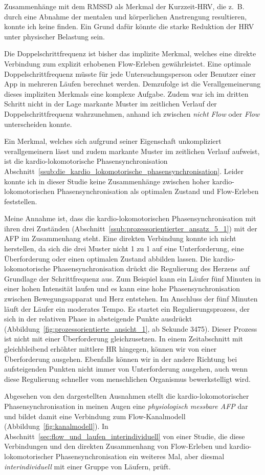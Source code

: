 Zusammenhänge mit dem \acs{RMSSD} als Merkmal der Kurzzeit-\ac{HRV}, die z.~B. durch eine Abnahme der mentalen und körperlichen Anstrengung resultieren, konnte ich keine finden. Ein Grund dafür könnte die starke Reduktion der \ac{HRV} unter physischer Belastung sein.

Die Doppelschrittfrequenz ist bisher das implizite Merkmal, welches eine direkte Verbindung zum explizit erhobenen Flow-Erleben gewährleistet. Eine optimale Doppelschrittfrequenz müsste für jede Untersuchungsperson oder Benutzer einer App in mehreren Läufen berechnet werden. Demzufolge ist die Verallgemeinerung dieses impliziten Merkmals eine komplexe Aufgabe. Zudem war ich im dritten Schritt nicht in der Lage markante Muster im zeitlichen Verlauf der Doppelschrittfrequenz wahrzunehmen, anhand ich zwischen \emph{nicht Flow} oder \emph{Flow} unterscheiden konnte.

Ein Merkmal, welches sich aufgrund seiner Eigenschaft unkompliziert verallgemeinern lässt und zudem markante Muster im zeitlichen Verlauf aufweist, ist die kardio-lokomotorische Phasensynchronisation Abschnitt~\ref{ssub:die_kardio_lokomotorische_phasensynchronisation}. Leider konnte ich in dieser Studie keine Zusammenhänge zwischen hoher kardio-lokomotorischen Phasensynchronisation als optimalen Zustand und Flow-Erleben feststellen. 

Meine Annahme ist, dass die kardio-lokomotorischen Phasensynchronisation mit ihren drei Zuständen (Abschnitt~\ref{ssub:prozessorientierter_ansatz_5_1}) mit der \ac{AFP} im Zusammenhang steht. Eine direkten Verbindung konnte ich nicht herstellen, da sich die drei Muster nicht 1 zu 1 auf eine Unterforderung, eine Überforderung oder einen optimalen Zustand abbilden lassen. Die kardio-lokomotorische Phasensynchronisation drückt die Regulierung des Herzens auf Grundlage der Schrittfrequenz aus. Zum Beispiel kann ein Läufer fünf Minuten in einer hohen Intensität laufen und es kann eine hohe Phasensynchronisation zwischen Bewegungsapparat und Herz entstehen. Im Anschluss der fünf Minuten läuft der Läufer ein moderates Tempo. Es startet ein Regulierungsprozess, der sich in der relativen Phase in absteigende Punkte ausdrückt (Abbildung~\ref{fig:prozessorientierte_ansicht_1}, ab Sekunde 3475). Dieser Prozess ist nicht mit einer Überforderung gleichzusetzen. In einem Zeitabschnitt mit gleichbleibend erhöhter mittlere \ac{HR} hingegen, können wir von einer Überforderung ausgehen. Ebenfalls können wir in der andere Richtung bei aufsteigenden Punkten nicht immer von Unterforderung ausgehen, auch wenn diese Regulierung schneller vom menschlichen Organismus bewerkstelligt wird.

Abgesehen von den dargestellten Ausnahmen stellt die kardio-lokomotorischer Phasensynchronisation in meinen Augen eine \emph{physiologisch messbare \ac{AFP}} dar und bildet damit eine Verbindung zum Flow-Kanalmodell (Abbildung~\ref{fig:kanalmodell}). In Abschnitt~\ref{sec:flow_und_laufen_interindividuell} von einer Studie, die diese Verbindungen und den direkten Zusammenhang von Flow-Erleben und kardio-lokomotorischer Phasensynchronisation ein weiteres Mal, aber diesmal \emph{interindividuell} mit einer Gruppe von Läufern, prüft. 


